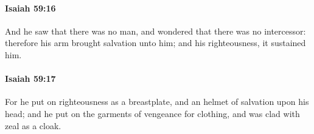 		\paragraph{Isaiah 59:16} %
			\label{ISAIAH-59-16}

			And he saw that there was no man, and wondered that there was no intercessor: therefore his arm brought salvation unto him; and his righteousness, it sustained him.


		\paragraph{Isaiah 59:17} %
			\label{ISAIAH-59-17}

			For he put on righteousness as a breastplate, and an helmet of salvation upon his head; and he put on the garments of vengeance for clothing, and was clad with zeal as a cloak.


